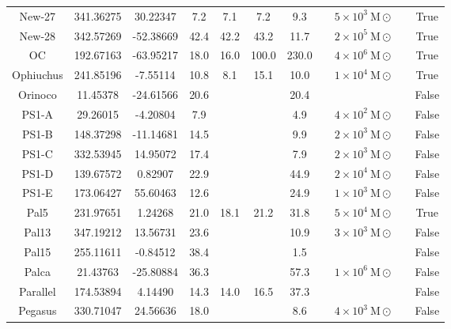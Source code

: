 \begin{table}
\begin{tabular}{ccccccccccc}
New-27 & 341.36275 & 30.22347 & 7.2 & 7.1 & 7.2 & 9.3 & \citet{ibata:2023} & $5 \times 10^{3}~\mathrm{M}\odot$ &  & True \\
New-28 & 342.57269 & -52.38669 & 42.4 & 42.2 & 43.2 & 11.7 & \citet{ibata:2023} & $2 \times 10^{5}~\mathrm{M}\odot$ &  & True \\
OC & 192.67163 & -63.95217 & 18.0 & 16.0 & 100.0 & 230.0 & \citet{koposov:2019} & $4 \times 10^{6}~\mathrm{M}\odot$ & \citet{koposov:2019} & True \\
Ophiuchus & 241.85196 & -7.55114 & 10.8 & 8.1 & 15.1 & 10.0 & \citet{ibata:2023} & $1 \times 10^{4}~\mathrm{M}\odot$ &  & True \\
Orinoco & 11.45378 & -24.61566 & 20.6 & & & 20.4 & \citet{grillmair:2017} & &  & False \\
PS1-A & 29.26015 & -4.20804 & 7.9 & & & 4.9 & \citet{bernard:2016} & $4 \times 10^{2}~\mathrm{M}\odot$ & \citet{bernard:2016} & False \\
PS1-B & 148.37298 & -11.14681 & 14.5 & & & 9.9 & \citet{bernard:2016} & $2 \times 10^{3}~\mathrm{M}\odot$ & \citet{bernard:2016} & False \\
PS1-C & 332.53945 & 14.95072 & 17.4 & & & 7.9 & \citet{bernard:2016} & $2 \times 10^{3}~\mathrm{M}\odot$ & \citet{bernard:2016} & False \\
PS1-D & 139.67572 & 0.82907 & 22.9 & & & 44.9 & \citet{bernard:2016} & $2 \times 10^{4}~\mathrm{M}\odot$ & \citet{bernard:2016} & False \\
PS1-E & 173.06427 & 55.60463 & 12.6 & & & 24.9 & \citet{bernard:2016} & $1 \times 10^{3}~\mathrm{M}\odot$ & \citet{bernard:2016} & False \\
Pal5 & 231.97651 & 1.24268 & 21.0 & 18.1 & 21.2 & 31.8 & \citet{ibata:2023} & $5 \times 10^{4}~\mathrm{M}\odot$ &  & True \\
Pal13 & 347.19212 & 13.56731 & 23.6 & & & 10.9 & \citet{shipp:2020} & $3 \times 10^{3}~\mathrm{M}\odot$ & \citet{shipp:2020} & False \\
Pal15 & 255.11611 & -0.84512 & 38.4 & & & 1.5 & \citet{myeong:2017} & &  & False \\
Palca & 21.43763 & -25.80884 & 36.3 & & & 57.3 & \citet{shipp:2018} & $1 \times 10^{6}~\mathrm{M}\odot$ & \citet{thomas:2022} & False \\
Parallel & 174.53894 & 4.14490 & 14.3 & 14.0 & 16.5 & 37.3 & \citet{weiss:2018} & &  & False \\
Pegasus & 330.71047 & 24.56636 & 18.0 & & & 8.6 & \citet{perottoni:2019} & $4 \times 10^{3}~\mathrm{M}\odot$ & \citet{perottoni:2019} & False \\

\end{tabular}
\end{table}
